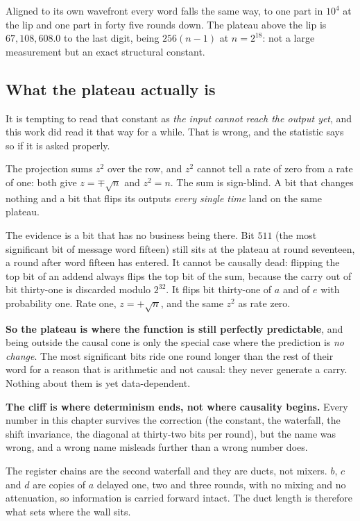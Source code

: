 Aligned to its own wavefront every word falls the same way, to one part in \(10^{4}\) at the lip and
one part in forty five rounds down. The plateau above the lip is \(67{,}108{,}608.0\) to the last
digit, being \(256(n-1)\) at \(n = 2^{18}\): not a large measurement but an exact structural
constant.

\subsection{What the plateau actually is}

It is tempting to read that constant as \emph{the input cannot reach the output yet}, and this work
did read it that way for a while. That is wrong, and the statistic says so if it is asked properly.

The projection sums \(z^{2}\) over the row, and \(z^{2}\) cannot tell a rate of zero from a rate of
one: both give \(z = \mp\sqrt{n}\) and \(z^{2} = n\). The sum is sign-blind. A bit that changes
nothing and a bit that flips its outputs \emph{every single time} land on the same plateau.

The evidence is a bit that has no business being there. Bit \(511\) (the most significant bit of
message word fifteen) still sits at the plateau at round seventeen, a round after word fifteen
has entered. It cannot be causally dead: flipping the top bit of an addend always flips the top bit
of the sum, because the carry out of bit thirty-one is discarded modulo \(2^{32}\). It flips bit
thirty-one of \(a\) and of \(e\) with probability one. Rate one, \(z = +\sqrt{n}\), and the same
\(z^{2}\) as rate zero.

\textbf{So the plateau is where the function is still perfectly predictable}, and being outside the
causal cone is only the special case where the prediction is \emph{no change}. The most significant
bits ride one round longer than the rest of their word for a reason that is arithmetic and not
causal: they never generate a carry. Nothing about them is yet data-dependent.

\textbf{The cliff is where determinism ends, not where causality begins.} Every number in this
chapter survives the correction (the constant, the waterfall, the shift invariance, the diagonal
at thirty-two bits per round), but the name was wrong, and a wrong name misleads further than a
wrong number does.

The register chains are the second waterfall and they are ducts, not mixers. \(b\), \(c\)
and \(d\) are copies of \(a\) delayed one, two and three rounds, with no mixing and no attenuation,
so information is carried forward intact. The duct length is therefore what sets where the wall
sits.


